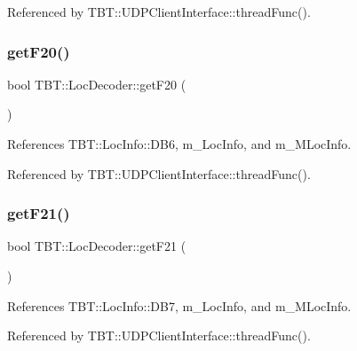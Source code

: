 Referenced by T\+B\+T\+::\+U\+D\+P\+Client\+Interface\+::thread\+Func().

\mbox{\label{classTBT_1_1LocDecoder_abcb11e56a79e9229212139723630aef0_abcb11e56a79e9229212139723630aef0}} 
\subsubsection{\texorpdfstring{get\+F20()}{getF20()}}
{\footnotesize\ttfamily bool T\+B\+T\+::\+Loc\+Decoder\+::get\+F20 (\begin{DoxyParamCaption}{ }\end{DoxyParamCaption})\hspace{0.3cm}{\ttfamily [inline]}}



References T\+B\+T\+::\+Loc\+Info\+::\+D\+B6, m\+\_\+\+Loc\+Info, and m\+\_\+\+M\+Loc\+Info.



Referenced by T\+B\+T\+::\+U\+D\+P\+Client\+Interface\+::thread\+Func().

\mbox{\label{classTBT_1_1LocDecoder_a89ea694d153a4f68ffe7df1f37fd7fc6_a89ea694d153a4f68ffe7df1f37fd7fc6}} 
\subsubsection{\texorpdfstring{get\+F21()}{getF21()}}
{\footnotesize\ttfamily bool T\+B\+T\+::\+Loc\+Decoder\+::get\+F21 (\begin{DoxyParamCaption}{ }\end{DoxyParamCaption})\hspace{0.3cm}{\ttfamily [inline]}}



References T\+B\+T\+::\+Loc\+Info\+::\+D\+B7, m\+\_\+\+Loc\+Info, and m\+\_\+\+M\+Loc\+Info.



Referenced by T\+B\+T\+::\+U\+D\+P\+Client\+Interface\+::thread\+Func().

\mbox{\label{classTBT_1_1LocDecoder_a9d95d2ac3b1079b9ffa519440808d4e2_a9d95d2ac3b1079b9ffa519440808d4e2}} 
